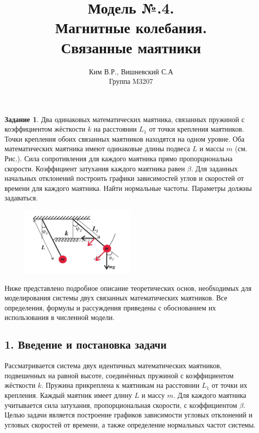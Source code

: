 \documentclass[a4paper,11pt]{article}
\title{Модель №.4. \\ Магнитные колебания. \\ Связанные маятники }
\author{Ким В.Р., Вишневский С.А \\ Группа M3207 }
\date{}
\theoremstyle{definition}
\newtheorem*{task}{Задание}\setlength{\parindent}{0pt}
\begin{document}
\maketitle

\begin{task}
    Два одинаковых математических маятника, связанных пружиной с коэффициентом 
    жёсткости \(k\) на расстоянии \(L_1\) от точки крепления маятников. 
    Точки крепления обоих связанных маятников находятся на одном уровне. 
    Оба математических маятника имеют одинаковые длины подвеса \(L\) и массы \(m\) 
    (см. Рис.). 
    Сила сопротивления для каждого маятника прямо пропорциональна скорости. 
    Коэффициент затухания каждого маятника равен \(\beta\). Для заданных начальных 
    отклонений построить графики зависимостей углов и скоростей от времени 
    для каждого маятника. Найти нормальные частоты. 
    Параметры должны задаваться.

    \begin{figure}[H]
        \centering
        \includegraphics[width=0.5\textwidth]{"4. Connected pendulum/task.png"}  
    \end{figure}

\end{task}



Ниже представлено подробное описание теоретических основ, необходимых для моделирования системы 
двух связанных математических маятников. Все определения, формулы и рассуждения приведены с обоснованием 
их использования в численной модели.

\subsection*{1. Введение и постановка задачи}
Рассматривается система двух идентичных математических маятников, подвешенных на равной высоте, соединённых 
пружиной с коэффициентом жёсткости \( k \). Пружина прикреплена к маятникам на расстоянии \( L_1 \) от точки 
их крепления. Каждый маятник имеет длину \( L \) и массу \( m \). Для каждого маятника учитывается сила 
затухания, пропорциональная скорости, с коэффициентом \(\beta\). Целью задачи является построение графиков 
зависимости угловых отклонений и угловых скоростей от времени, а также определение нормальных частот системы.
\end{document}

